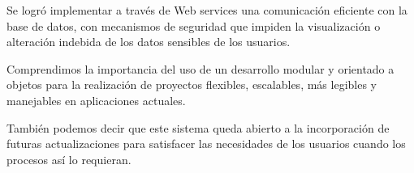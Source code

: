 Se logró implementar a través de Web services una comunicación eficiente con la base de datos, con mecanismos de seguridad que impiden la visualización o alteración indebida de los datos sensibles de los usuarios.

Comprendimos la importancia del uso de un desarrollo modular y orientado a objetos para la realización de proyectos flexibles, escalables, más legibles y manejables en aplicaciones actuales.

También podemos decir que este sistema queda abierto a la incorporación de futuras actualizaciones para satisfacer las necesidades de los usuarios cuando los procesos así lo requieran.

\label{chap:conclusiones}

